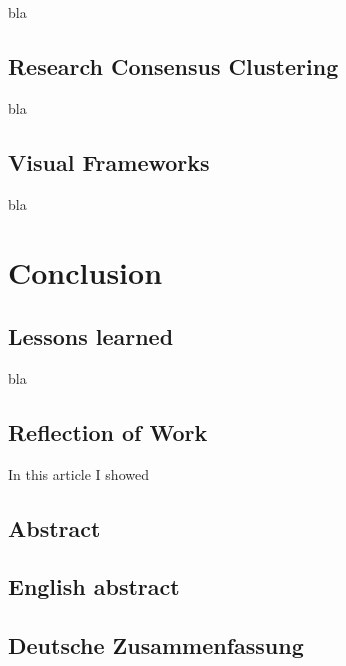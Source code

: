 \documentclass[
	a4paper,
	english,
	twoside,
	openright,               
	11pt                            
	]{report}
\begin{document}
bla

\section{Research Consensus Clustering}

bla

\section{Visual Frameworks}

bla


\chapter{Conclusion}\label{cha:conclusion}

\section{Lessons learned}
bla 

\section{Reflection of Work}
In this article I showed 

\begin{appendices}

\chapter{Abstract} %
\label{cha:abstract}

\section{English abstract} %
\label{sec:english_abstract}



\newpage

\section{Deutsche Zusammenfassung} %
\label{sec:deutsche_zusammenfassung}








% 
% 
% 

\end{appendices}

\cleardoublepage

 



\printglossaries
\end{document}
